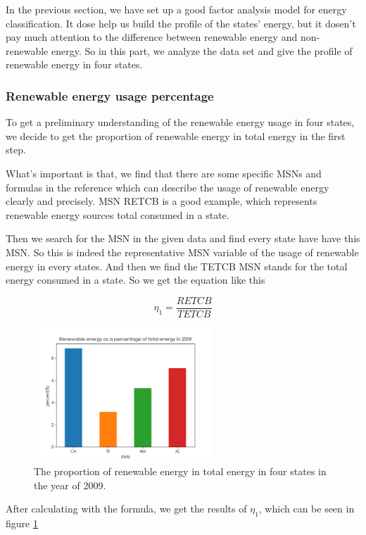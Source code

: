 \documentclass[a4paper,11pt]{article}
\begin{document}
\par In the previous section, we have set up a good factor analysis model for energy classification. It dose help us build the profile of the states' energy, but it dosen't pay much attention to the difference between renewable energy and non-renewable energy. So in this part, we analyze the data set and give the profile of renewable energy in four states.
\subsubsection{Renewable energy usage percentage}
\par To get a preliminary understanding of the renewable energy usage in four states, we decide to get the proportion of renewable energy in total energy in the first step.

\par What's important is that, we find that there are some specific MSNs and formulas in the reference \cite{4} which can describe the usage of renewable energy clearly and precisely. MSN RETCB is a good example, which represents renewable energy sources total consumed in a state.
\par Then we search for the MSN in the given data and find every state have have this MSN. So this is indeed the representative MSN variable of the usage of renewable energy in every states. And then we find the TETCB MSN stands for the total energy consumed in a state. So we get the equation like this

\begin{equation}
    \eta_1=\frac{RETCB}{TETCB}
\end{equation}

\begin{figure}[h]%
    \centering 
    \includegraphics[width=0.6\textwidth]{./Pic/1-2.png}
    \caption{The proportion of renewable energy in total energy in four states in the year of 2009.}
    \label{fig:1-2}  
\end{figure}
\par After calculating with the formula, we get the results of $\eta_1$, which can be seen in figure \ref{fig:1-2}
\end{document}
